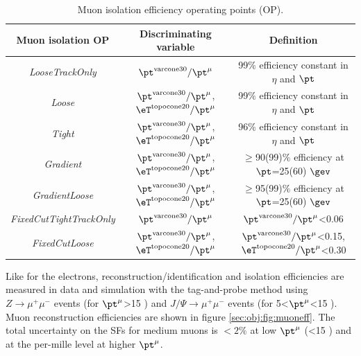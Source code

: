 \begin{table}\footnotesize
\begin{center}
\begin{tabular}{|c|c|c|}
  \hline \hline
   Muon isolation OP &Discriminating variable &  Definition \\
  \hline
  {\sl LooseTrackOnly} & $\pt^{\rm varcone30}/\pt^{\mu}$ &99$\%$ efficiency constant in $\eta$ and $\pt$\\
  \hline
  {\sl Loose} & $\pt^{\rm varcone30}/\pt^{\mu}$, $\eT^{\rm topocone20}/\pt^{\mu}$&99$\%$ efficiency constant in $\eta$ and $\pt$\\
  \hline
  {\sl Tight} & $\pt^{\rm varcone30}/\pt^{\mu}$, $\eT^{\rm topocone20}/\pt^{\mu}$&96$\%$ efficiency constant in $\eta$ and $\pt$\\
  \hline
  {\sl Gradient} & $\pt^{\rm varcone30}/\pt^{\mu}$, $\eT^{\rm topocone20}/\pt^{\mu}$&$\ge$90(99)$\%$ efficiency at $\pt$=25(60) $\gev$\\
  \hline
  {\sl GradientLoose} & $\pt^{\rm varcone30}/\pt^{\mu}$, $\eT^{\rm topocone20}/\pt^{\mu}$&$\ge$95(99)$\%$ efficiency at $\pt$=25(60) $\gev$\\
  \hline
  {\sl FixedCutTightTrackOnly}& $\pt^{\rm varcone30}/\pt^{\mu}$&$\pt^{\rm varcone30}/\pt^{\mu}$<0.06\\
  \hline
{\sl FixedCutLoose}& $\pt^{\rm varcone30}/\pt^{\mu}$, $\eT^{\rm topocone20}/\pt^{\mu}$&$\pt^{\rm varcone30}/\pt^{\mu}$<0.15, $\eT^{\rm topocone20}/\pt^{\mu}$<0.30\\
 \hline \hline
\end{tabular}
\captionsetup{width=0.85\textwidth} \caption{\small Muon isolation efficiency operating points (OP).}
\label{tab:obj:lep:muiso}
\end{center}
\end{table}

Like for the electrons, reconstruction/identification and isolation efficiencies are measured in data and simulation with the tag-and-probe method using $Z\to \mu^{+}\mu^{-}$ events (for $\pt^{\mu}$>15 \gev) and $J/\Psi \to \mu^{+} \mu^{-}$ events (for 5<$\pt^{\mu}$<15 \gev). Muon reconstruction efficiencies are shown in figure \ref{sec:obj:fig:muoneff}. The total uncertainty on the SFs for medium muons is $<2\%$ at low $\pt^{\mu}$ (<15 \gev) and at the per-mille level at higher $\pt^{\mu}$.

